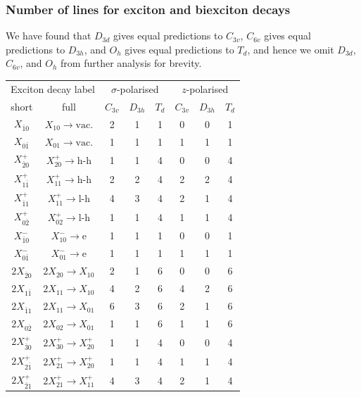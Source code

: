 \subsubsection{Number of lines for exciton and biexciton decays} \label{sec:testing_against_data}
We have found that $D_{3d}$ gives equal predictions to $C_{3v}$, $C_{6v}$ gives equal predictions to $D_{3h}$, and $O_h$ gives equal predictions to $T_d$, and hence we omit $D_{3d}$, $C_{6v}$, and $O_h$ from further analysis for brevity.

\begin{table}
\begin{center}
\begin{tabular}{c c | c c c | c c c}
\multicolumn{2}{c}{Exciton decay label} &  \multicolumn{3}{c}{$\sigma$-polarised} & \multicolumn{3}{c}{$z$-polarised}\\
short & full & $C_{3v}$ & $D_{3h}$ & $T_d$ & $C_{3v}$ & $D_{3h}$ & $T_d$ \\\hline
 $X_{\bar{1}0}$ & $X_{10}\to \text{vac.}$ & 2 & 1 & 1 & 0 & 0 & 1\\
 $X_{0\bar{1}}$ & $X_{01}\to \text{vac.}$ & 1 & 1 & 1 & 1 & 1 & 1\\
 $X^+_{\bar{2}0}$ & $X^+_{20}\to \text{h-h}$ & 1 & 1 & 4 & 0 & 0 & 4\\
 $X^+_{1\bar{1}}$ & $X^+_{11}\to \text{h-h}$ & 2 & 2 & 4 & 2 & 2 & 4\\
 $X^+_{\bar{1}1}$ & $X^+_{11}\to \text{l-h}$ & 4 & 3 & 4 & 2 & 1 & 4\\
 $X^+_{0\bar{2}}$ & $X^+_{02}\to \text{l-h}$ & 1 & 1 & 4 & 1 & 1 & 4\\
 $X^-_{\bar{1}0}$ & $X^-_{10}\to \text{e}$ & 1 & 1 & 1 & 0 & 0 & 1\\
 $X^-_{0\bar{1}}$ & $X^-_{01}\to \text{e}$ & 1 & 1 & 1 & 1 & 1 & 1\\
 $2X_{\bar{2}0}$ & $2X_{20}\to X_{10}$ & 2 & 1 & 6 & 0 & 0 & 6\\
 $2X_{1\bar{1}}$ & $2X_{11}\to X_{10}$ & 4 & 2 & 6 & 4 & 2 & 6\\
 $2X_{\bar{1}1}$ & $2X_{11}\to X_{01}$ & 6 & 3 & 6 & 2 & 1 & 6\\
 $2X_{0\bar{2}}$ & $2X_{02}\to X_{01}$ & 1 & 1 & 6 & 1 & 1 & 6\\
 $2X^+_{\bar{3}0}$ & $2X^+_{30}\to X^+_{20}$ & 1 & 1 & 4 & 0 & 0 & 4\\
 $2X^+_{2\bar{1}}$ & $2X^+_{21}\to X^+_{20}$ & 1 & 1 & 4 & 1 & 1 & 4\\
 $2X^+_{\bar{2}1}$ & $2X^+_{21}\to X^+_{11}$ & 4 & 3 & 4 & 2 & 1 & 4\\

\end{tabular}
\end{center}
\end{table}
